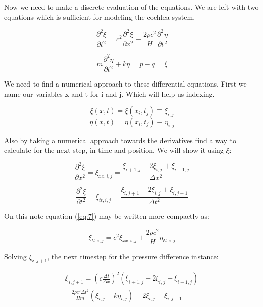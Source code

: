 \documentclass[twoside,twocolumn]{article}
\begin{document}
Now we need to make  a discrete evaluation of the equations. We are left with two equations which is sufficient for modeling the cochlea system. 

 \begin{equation}\label{eq:7}
\frac{\partial^2 \xi}{\partial t^2}  = c^2\frac{\partial^2 \xi}{\partial x^2} -  \frac{2\rho c^2}{H} \frac{\partial^2 \eta}{\partial t^2}
\end{equation}

\begin{equation}\label{eq:8}
m\frac{\partial^2\eta}{\partial t^2} + k\eta = p-q = \xi
\end{equation}

We need to find a numerical approach to these differential equations. First we name our variables x and t for i and j. Which will help us indexing. 


\begin{equation}
\xi(x,t) = \xi(x_i,t_j) \equiv \xi_{i,j}  
\end{equation}
\begin{equation}
\eta(x,t) = \eta(x_i,t_j) \equiv \eta_{i,j}  
\end{equation}

Also by taking a numerical approach towards the derivatives find a way to calculate for the next step, in time and position. We will show it using $\xi$: 

 \begin{equation}
\frac{\partial^2 \xi}{\partial x^2}  = \xi_{xx,i,j} = \frac{\xi_{i+1,j} - 2\xi_{i,j} + \xi_{i-1,j}}{\Delta x^2}
\end{equation}

\begin{equation}
\frac{\partial^2 \xi}{\partial t^2}  = \xi_{tt,i,j} = \frac{\xi_{i,j + 1} - 2\xi_{i,j} + \xi_{i,j-1}}{\Delta t^2}
\end{equation}

On this note equation (\ref{eq:7}) may be written more compactly as: 


 \begin{equation}\label{eq:9}
\xi_{tt,i,j}   = c^2 \xi_{xx,i,j} +  \frac{2\rho c^2}{H} \eta_{tt,i,j}
\end{equation}

Solving $\xi_{i,j+1}$, the next timestep for the pressure difference instance: 


\begin{multline*}
\xi_{i,j+1} = \left(c\frac{\Delta t}{\Delta x}\right)^2\left( \xi_{i+1,j} - 2\xi_{i,j} + \xi_{i-1,j} \right)  \\ 
- \frac{2\rho c^2 \Delta t^2}{Hm} \left(\xi_{i,j} - k\eta_{i,j}\right) + 2\xi_{i,j} -\xi_{i,j-1}
\end{multline*}
\end{document}
